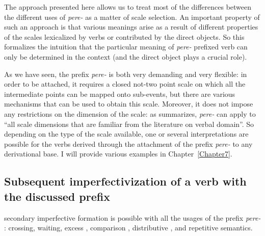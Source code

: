 The approach presented here allows us to treat most of the differences between the different uses of \textit{pere-}   as a matter of scale selection. An important property of such an approach is that various meanings arise as a result of different properties of the scales lexicalized by verbs or contributed by the direct objects. So this formalizes the intuition that the particular meaning of \textit{pere-}  prefixed verb can only be determined in the context   (and the direct object plays a crucial role). 

As we have seen, the prefix \textit{pere-}   is both very demanding and very flexible: in order to be attached, it requires a closed not-two point scale on which all the intermediate points can be mapped onto sub-events, but there are various mechanisms that can be used to obtain this scale. Moreover, it does not impose any restrictions on the dimension of the scale: as \citet[151]{Kagan:book} summarizes, \textit{pere-}   can apply to ``all scale dimensions that are familiar from the literature on verbal domain''. So depending on the type of the scale available, one or several interpretations are possible for the verbs derived through the attachment of the prefix \textit{pere-}   to any derivational base. I will provide various examples in Chapter~\ref{Chapter7}.

\subsection{Subsequent imperfectivization  of a verb with the discussed prefix}
secondary imperfective  formation is possible with all the usages of the prefix \textit{pere-}  : crossing, waiting, excess , comparison , distributive , and repetitive  semantics.

